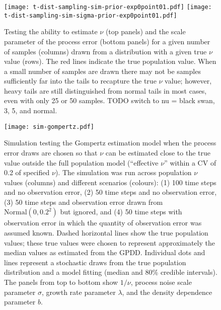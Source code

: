 \documentclass[12pt]{article}
\begin{document}
\begin{figure}[htbp]
\begin{center}
\texttt{[image: t-dist-sampling-sim-prior-exp0point01.pdf]}
\texttt{[image: t-dist-sampling-sim-sigma-prior-exp0point01.pdf]}
\caption{
  Testing the ability to estimate $\nu$ (top panels) and the scale parameter of the process error (bottom panels) for a given number of samples (columns) drawn from a distribution with a given true $\nu$ value (rows). The red lines indicate the true population value. When a small number of samples are drawn there may not be samples sufficiently far into the tails to recapture the true $\nu$ value; however, heavy tails are still distinguished from normal tails in most cases, even with only 25 or 50 samples. TODO switch to nu = black swan, 3, 5, and normal.
}
\label{fig:sim-nu}
\end{center}
\end{figure}

\clearpage

\begin{figure}[htbp]
\begin{center}
\texttt{[image: sim-gompertz.pdf]}
\caption{Simulation testing the Gompertz estimation model when the process error draws are chosen so that $\nu$ can be estimated close to the true value outside the full population model (``effective $\nu$'' within a CV of 0.2 of specified $\nu$).
  The simulation was run across population $\nu$ values (columns) and different scenarios (colours): (1) 100 time steps and no observation error, (2) 50 time steps and no observation error, (3) 50 time steps and observation error drawn from $\mathrm{Normal} (0, 0.2^2)$ but ignored, and (4) 50 time steps with observation error in which the quantity of observation error was assumed known.
  Dashed horizontal lines show the true population values;
  these true values were chosen to represent approximately the median values as estimated from the GPDD.
  Individual dots and lines represent a stochastic draws from the true population distribution and a model fitting (median and 80\% credible intervals).
  The panels from top to bottom show $1/\nu$, process noise scale parameter $\sigma$, growth rate parameter $\lambda$, and the density dependence parameter $b$.}
\label{fig:sim-gompertz}
\end{center}
\end{figure}
\end{document}
